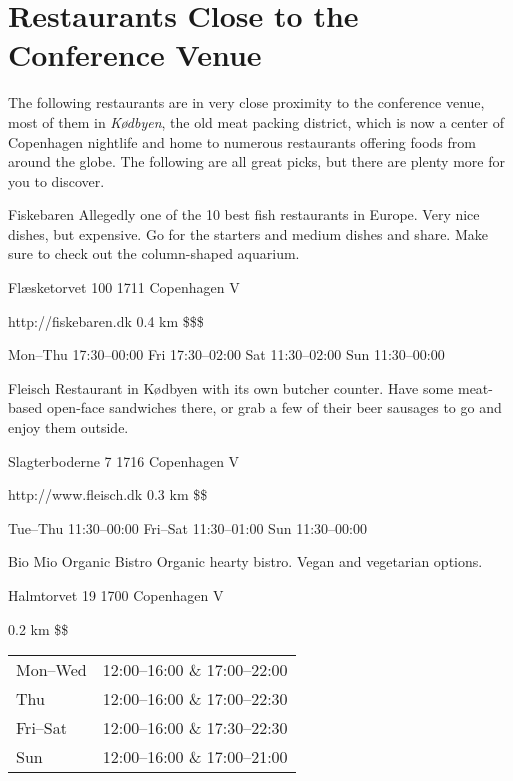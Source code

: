 \section{Restaurants Close to the Conference Venue}
The following restaurants are in very close proximity to the conference venue, most of them in \emph{Kødbyen}, the old meat packing district, which is now a center of Copenhagen nightlife and home to numerous restaurants offering foods from around the globe. The following are all great picks, but there are plenty more for you to discover.
\par
\bigskip
\begin{fooditem}
{Fiskebaren}
{Allegedly one of the 10 best fish restaurants in Europe. Very nice dishes, but expensive. Go for the starters and medium dishes and share. Make sure to check out the column-shaped aquarium.}
{\begin{addr}
{Flæsketorvet 100}
{1711 Copenhagen V}
\end{addr}}
{http://fiskebaren.dk}
{0.4 km}
{\$\$\$}
{\begin{ohours}
{Mon–Thu}
{17:30–00:00}
{Fri}
{17:30–02:00}
{Sat}
{11:30–02:00}
{Sun}
{11:30–00:00}
\end{ohours}}
\end{fooditem}
\begin{fooditem}
{Fleisch}
{Restaurant in Kødbyen with its own butcher counter. Have some meat-based open-face sandwiches there, or grab a few of their beer sausages to go and enjoy them outside.}
{\begin{addr}
{Slagterboderne 7}
{1716 Copenhagen V}
\end{addr}}
{http://www.fleisch.dk}
{0.3 km}
{\$\$}
{\begin{ohours}
{Tue--Thu}
{11:30--00:00}
{Fri--Sat}
{11:30--01:00}
{Sun}
{11:30--00:00}
{}
{}
\end{ohours}}
\end{fooditem}


\begin{fooditemwourl}
{Bio Mio Organic Bistro}
{Organic hearty bistro. Vegan and vegetarian options.}
{\begin{addr}
{Halmtorvet 19}
{1700 Copenhagen V}
\end{addr}}
{0.2 km}
{\$\$}
{\begin{tabular}{l l} 
Mon--Wed & 12:00--16:00 \& 17:00--22:00\\
Thu & 12:00--16:00 \& 17:00--22:30\\
Fri--Sat & 12:00--16:00 \& 17:30--22:30\\
Sun & 12:00--16:00 \& 17:00--21:00
\end{tabular}}
\end{fooditemwourl}



